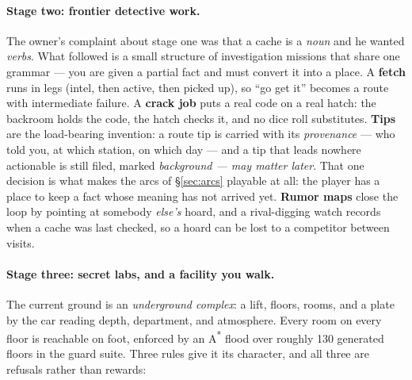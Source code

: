\documentclass[10pt,twocolumn]{article}
\begin{document}
\paragraph{Stage two: frontier detective work.} The owner's complaint about stage one was
that a cache is a \emph{noun} and he wanted \emph{verbs}. What followed is a small structure
of investigation missions that share one grammar --- you are given a partial fact and must
convert it into a place. A \textbf{fetch} runs in legs (intel, then active, then picked up),
so ``go get it'' becomes a route with intermediate failure. A \textbf{crack job} puts a real
code on a real hatch: the backroom holds the code, the hatch checks it, and no dice roll
substitutes. \textbf{Tips} are the load-bearing invention: a route tip is carried with its
\emph{provenance} --- who told you, at which station, on which day --- and a tip that leads
nowhere actionable is still filed, marked \emph{background --- may matter later}. That one
decision is what makes the arcs of \S\ref{sec:arcs} playable at all: the player has a place
to keep a fact whose meaning has not arrived yet. \textbf{Rumor maps} close the loop by
pointing at somebody \emph{else's} hoard, and a rival-digging watch records when a cache was
last checked, so a hoard can be lost to a competitor between visits.

\paragraph{Stage three: secret labs, and a facility you walk.} The current ground is an
\emph{underground complex}: a lift, floors, rooms, and a plate by the car reading depth,
department, and atmosphere. Every room on every floor is reachable on foot, enforced by an
A\textsuperscript{*} flood over roughly 130 generated floors in the guard suite. Three rules
give it its character, and all three are refusals rather than rewards:
\end{document}
